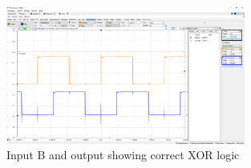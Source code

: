 \documentclass{article}
\begin{document}
	
	\begin{figure}[H]
	    \centering
	    \includegraphics[width=0.7\textwidth]{3a-lab}
	    \caption{Input B and output showing correct XOR logic}
	\end{figure}

	
\end{document}
